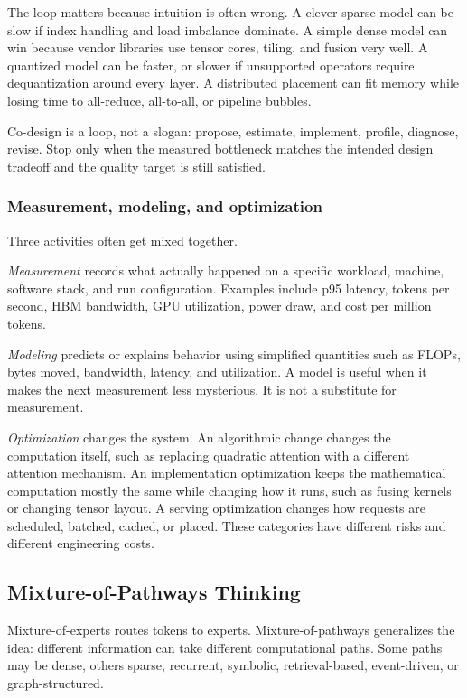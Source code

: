The loop matters because intuition is often wrong. A clever sparse model can be slow if index handling and load imbalance dominate. A simple dense model can win because vendor libraries use tensor cores, tiling, and fusion very well. A quantized model can be faster, or slower if unsupported operators require dequantization around every layer. A distributed placement can fit memory while losing time to all-reduce, all-to-all, or pipeline bubbles.

\begin{aside}
Co-design is a loop, not a slogan: propose, estimate, implement, profile, diagnose, revise. Stop only when the measured bottleneck matches the intended design tradeoff and the quality target is still satisfied.
\end{aside}

\subsubsection{Measurement, modeling, and optimization}

Three activities often get mixed together.

\emph{Measurement} records what actually happened on a specific workload, machine, software stack, and run configuration. Examples include p95 latency, tokens per second, HBM bandwidth, GPU utilization, power draw, and cost per million tokens.

\emph{Modeling} predicts or explains behavior using simplified quantities such as FLOPs, bytes moved, bandwidth, latency, and utilization. A model is useful when it makes the next measurement less mysterious. It is not a substitute for measurement.

\emph{Optimization} changes the system. An algorithmic change changes the computation itself, such as replacing quadratic attention with a different attention mechanism. An implementation optimization keeps the mathematical computation mostly the same while changing how it runs, such as fusing kernels or changing tensor layout. A serving optimization changes how requests are scheduled, batched, cached, or placed. These categories have different risks and different engineering costs.

\subsection{Mixture-of-Pathways Thinking}

Mixture-of-experts routes tokens to experts. Mixture-of-pathways generalizes the idea: different information can take different computational paths. Some paths may be dense, others sparse, recurrent, symbolic, retrieval-based, event-driven, or graph-structured.

